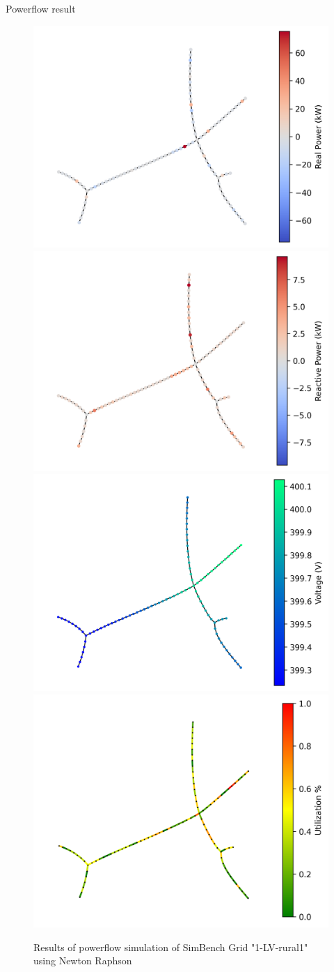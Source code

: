 \documentclass[final]{beamer}
\newlength{\colwidth}
\begin{document}
\begin{frame}[t]
\begin{columns}[t]
\begin{column}{\colwidth}
\begin{block}{Powerflow result}
  \begin{figure}
    \includegraphics[width=.48\textwidth]{img/graphs/rural1/power.png}\hfill
    \includegraphics[width=.48\textwidth]{img/graphs/rural1/power_react.png}\hfill
    \\[\smallskipamount]
    \includegraphics[width=.48\textwidth]{img/graphs/rural1/voltage.png}\hfill
    \includegraphics[width=.48\textwidth]{img/graphs/rural1/cable_utilization.png}\hfill
    \caption{Results of powerflow simulation of SimBench Grid "1-LV-rural1"\autocite{en13123290} using Newton Raphson }\label{fig:foobar}
  \end{figure}  


\end{block}
\end{column}
\end{columns}
\end{frame}
\end{document}
